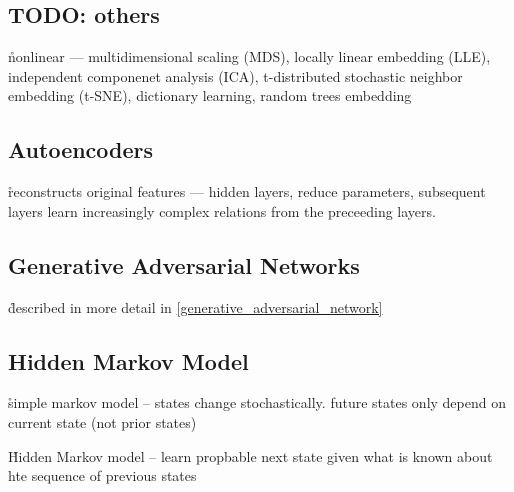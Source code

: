 \subsection{TODO: others}





\r{nonlinear --- multidimensional scaling (MDS), locally linear embedding (LLE), independent componenet analysis (ICA), t-distributed stochastic neighbor embedding (t-SNE), dictionary learning, random trees embedding}

\subsection{Autoencoders}


\r{reconstructs original features --- hidden layers, reduce parameters, subsequent layers learn increasingly complex relations from the preceeding layers.}

\subsection{Generative Adversarial Networks}

\r{described in more detail in \ref{generative_adversarial_network}}

\subsection{Hidden Markov Model}

\r{simple markov model -- states change stochastically. future states only depend on current state (not prior states)}

\r{Hidden Markov model -- learn propbable next state given what is known about hte sequence of previous states}